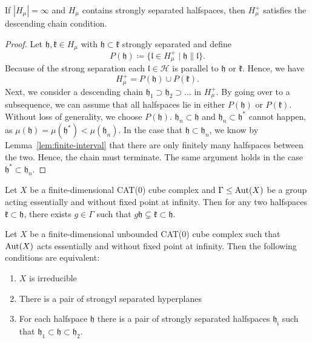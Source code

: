 \begin{lemma}[{\cite[Lemma~4.18]{MR3509968}}]
  \label{lem:4.18}
  If \(|H_\mu| = \infty\) and \(H_\mu\) contains strongly separated halfspaces, then \(H_\mu^+\) satisfies the descending chain condition.
\end{lemma}

\begin{proof}
  Let \(\mathfrak{h, k} \in H_\mu\) with \(\mathfrak{h} \subset \mathfrak{k}\) strongly separated and define
  \[
    P(\mathfrak{h}) \coloneqq \{\mathfrak{l} \in H_\mu^+ \mid \mathfrak{h} \parallel \mathfrak{l}\}.
  \]
  Because of the strong separation each \(\mathfrak{l} \in \mathcal{H}\) is parallel to \(\mathfrak{h}\) or \(\mathfrak{k}\). Hence, we have
  \[
    H_\mu^+ = P(\mathfrak{h}) \cup P(\mathfrak{k}).
  \]
  Next, we consider a descending chain \(\mathfrak{h_1} \supset \mathfrak{h_2} \supset \dots\) in \(H_\mu^+\). By going over to a subsequence, we can assume that all halfspaces lie in either \(P(\mathfrak{h})\) or \(P(\mathfrak{k})\). Without loss of generality, we choose \(P(\mathfrak{h})\). \(\mathfrak{h}_n \subset \mathfrak{h}\) and \(\mathfrak{h}_n \subset \mathfrak{h}^\ast\) cannot happen, as \(\mu(\mathfrak{h}) = \mu(\mathfrak{h}^\ast) < \mu(\mathfrak{h}_n)\). In the case that \(\mathfrak{h} \subset \mathfrak{h}_n\), we know by Lemma~\ref{lem:finite-interval} that there are only finitely many halfspaces between the two. Hence, the chain must terminate. The same argument holds in the case \(\mathfrak{h}^\ast \subset \mathfrak{h}_n\).
\end{proof}

\begin{lemma}
  \label{lem:cs-dsl}
  Let \(X\) be a finite-dimensional CAT(0) cube complex and \(\Gamma \leq \operatorname{Aut}(X)\) be a group acting essentially and without fixed point at infinity. Then for any two halfspaces \(\mathfrak{k} \subset \mathfrak{h}\), there exists \(g \in \Gamma\) such that \(g \mathfrak{h} \subsetneq \mathfrak{k} \subset \mathfrak{h}\).
\end{lemma}

\begin{prop}
  \label{prop:cs-5.1}
  Let \(X\) be a finite-dimensional unbounded CAT(0) cube complex such that \(\operatorname{Aut}(X)\) acts essentially and without fixed point at infinity. Then the following conditions are equivalent:
  \begin{enumerate}
  \item \(X\) is irreducible
  \item There is a pair of strongyl separated hyperplanes
  \item For each halfspace \(\mathfrak{h}\) there is a pair of strongly separated halfspaces \(\mathfrak{h_i}\) such that \(\mathfrak{h}_1 \subset \mathfrak{h} \subset \mathfrak{h}_2\).
  \end{enumerate}
\end{prop}

